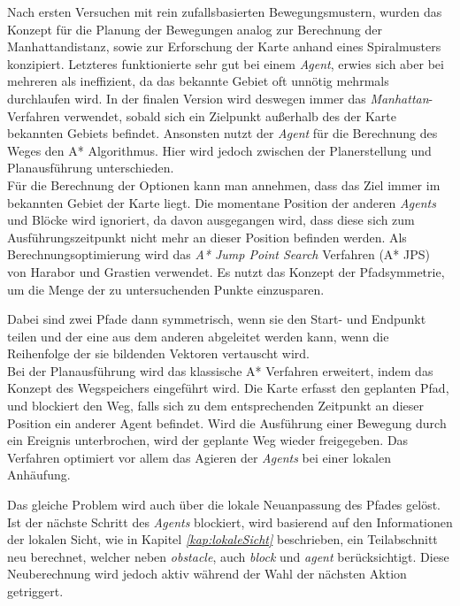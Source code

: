 Nach ersten Versuchen mit rein zufallsbasierten Bewegungsmustern, wurden das Konzept für die Planung der Bewegungen analog zur Berechnung der Manhattandistanz, sowie zur Erforschung der Karte anhand eines Spiralmusters konzipiert. Letzteres funktionierte sehr gut bei einem \textit{Agent}, erwies sich aber bei mehreren als ineffizient, da das bekannte Gebiet oft unnötig mehrmals durchlaufen wird.  
In der finalen Version wird deswegen immer das \textit{Manhattan}-Verfahren verwendet, sobald sich ein Zielpunkt außerhalb des der Karte bekannten Gebiets befindet. Ansonsten nutzt der \textit{Agent} für die Berechnung des Weges den A* Algorithmus. Hier wird jedoch zwischen der Planerstellung und Planausführung unterschieden. \\

Für die Berechnung der Optionen kann man annehmen, dass das Ziel immer im bekannten Gebiet der Karte liegt. Die momentane Position der anderen \textit{Agents} und Blöcke wird ignoriert, da davon ausgegangen wird, dass diese sich zum Ausführungszeitpunkt nicht mehr an dieser Position befinden werden. Als Berechnungsoptimierung wird das \textit{A* Jump Point Search} Verfahren (A* JPS) \cite{ref_proc1} von Harabor und Grastien verwendet. Es nutzt das Konzept der Pfadsymmetrie, um die Menge der zu untersuchenden Punkte einzusparen.

Dabei sind zwei Pfade dann symmetrisch, wenn sie den Start- und Endpunkt teilen und der eine aus dem anderen abgeleitet werden kann, wenn die Reihenfolge der sie bildenden Vektoren vertauscht wird. \\

Bei der Planausführung wird das klassische A* Verfahren erweitert, indem das Konzept des Wegspeichers eingeführt wird. Die Karte erfasst den geplanten Pfad, und blockiert den Weg, falls sich zu dem entsprechenden Zeitpunkt an dieser Position ein anderer Agent befindet.  Wird die Ausführung einer Bewegung durch ein Ereignis unterbrochen, wird der geplante Weg wieder freigegeben. Das Verfahren optimiert vor allem das Agieren der \textit{Agents} bei einer lokalen Anhäufung. 

Das gleiche Problem wird auch über die lokale Neuanpassung des Pfades gelöst. Ist der nächste Schritt des \textit{Agents} blockiert, wird basierend auf den Informationen der lokalen Sicht, wie in Kapitel \textit{\ref{kap:lokaleSicht}} beschrieben, ein Teilabschnitt neu berechnet, welcher neben \textit{obstacle}, auch \textit{block} und \textit{agent} berücksichtigt. Diese Neuberechnung wird jedoch aktiv während der Wahl der nächsten Aktion getriggert. 

